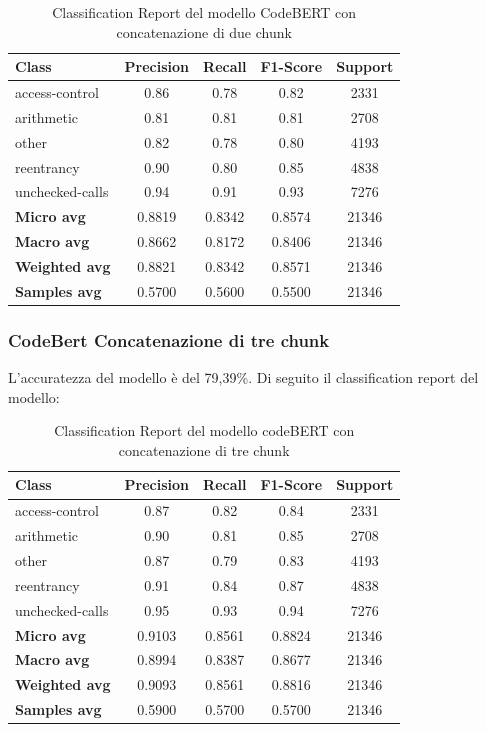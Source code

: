 \documentclass[../../Thesis.tex]{subfiles}
\begin{document}
\begin{table}[H]
\centering
\small
\begin{tabular}{lcccc}
\hline
\textbf{Class} & \textbf{Precision} & \textbf{Recall} & \textbf{F1-Score} & \textbf{Support} \\
\hline
access-control & 0.86 & 0.78 & 0.82 & 2331 \\
arithmetic & 0.81 & 0.81 & 0.81 & 2708 \\
other & 0.82 & 0.78 & 0.80 & 4193 \\
reentrancy & 0.90 & 0.80 & 0.85 & 4838 \\
unchecked-calls & 0.94 & 0.91 & 0.93 & 7276 \\
\hline
\textbf{Micro avg} & 0.8819 & 0.8342 & 0.8574 & 21346 \\
\textbf{Macro avg} & 0.8662 & 0.8172 & 0.8406 & 21346 \\
\textbf{Weighted avg} & 0.8821 & 0.8342 & 0.8571 & 21346 \\
\textbf{Samples avg} & 0.5700 & 0.5600 & 0.5500 & 21346 \\
\hline
\end{tabular}
\caption{Classification Report del modello CodeBERT con concatenazione di due chunk}
\end{table}
\subsubsection{CodeBert Concatenazione di tre chunk}
L'accuratezza del modello è del 79,39\%. Di seguito il classification report del modello:

\begin{table}[H]
\centering
\small
\begin{tabular}{lcccc}
\hline
\textbf{Class} & \textbf{Precision} & \textbf{Recall} & \textbf{F1-Score} & \textbf{Support} \\
\hline
access-control & 0.87 & 0.82 & 0.84 & 2331 \\
arithmetic & 0.90 & 0.81 & 0.85 & 2708 \\
other & 0.87 & 0.79 & 0.83 & 4193 \\
reentrancy & 0.91 & 0.84 & 0.87 & 4838 \\
unchecked-calls & 0.95 & 0.93 & 0.94 & 7276 \\
\hline
\textbf{Micro avg} & 0.9103 & 0.8561 & 0.8824 & 21346 \\
\textbf{Macro avg} & 0.8994 & 0.8387 & 0.8677 & 21346 \\
\textbf{Weighted avg} & 0.9093 & 0.8561 & 0.8816 & 21346 \\
\textbf{Samples avg} & 0.5900 & 0.5700 & 0.5700 & 21346 \\
\hline
\end{tabular}
\caption{Classification Report del modello codeBERT con concatenazione di tre chunk}
\end{table}
\end{document}
